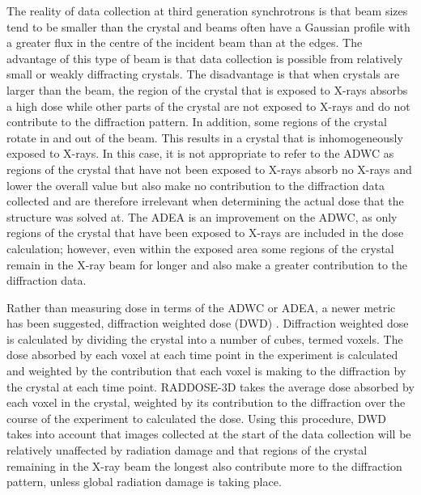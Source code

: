 
The reality of data collection at third generation synchrotrons is that beam sizes tend to be smaller than the crystal and beams often have a Gaussian profile with a greater flux in the centre of the incident beam than at the edges. The advantage of this type of beam is that data collection is possible from relatively small or weakly diffracting crystals. The disadvantage is that when crystals are larger than the beam, the region of the crystal that is exposed to X-rays absorbs a high dose while other parts of the crystal are not exposed to X-rays and do not contribute to the diffraction pattern. In addition, some regions of the crystal rotate in and out of the beam. This results in a crystal that is inhomogeneously exposed to X-rays. In this case, it is not appropriate to refer to the ADWC as regions of the crystal that have not been exposed to X-rays absorb no X-rays and lower the overall value but also make no contribution to the diffraction data collected and are therefore irrelevant when determining the actual dose that the structure was solved at. The ADEA is an improvement on the ADWC, as only regions of the crystal that have been exposed to X-rays are included in the dose calculation; however, even within the exposed area some regions of the crystal remain in the X-ray beam for longer and also make a greater contribution to the diffraction data.   

\par

Rather than measuring dose in terms of the ADWC or ADEA, a newer metric has been suggested, diffraction weighted dose (DWD) \cite{Zeldin2013b}. Diffraction weighted dose is calculated by dividing the crystal into a number of cubes, termed voxels. The dose absorbed by each voxel at each time point in the experiment is calculated and weighted by the contribution that each voxel is making to the diffraction by the crystal at each time point. RADDOSE-3D takes the average dose absorbed by each voxel in the crystal, weighted by its contribution to the diffraction over the course of the experiment to calculated the dose. Using this procedure, DWD takes into account that images collected at the start of the data collection will be relatively unaffected by radiation damage and that regions of the crystal remaining in the X-ray beam the longest also contribute more to the diffraction pattern, unless global radiation damage is taking place.      

